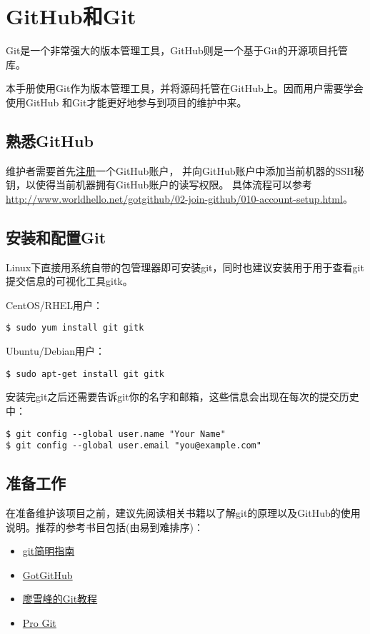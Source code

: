 \section{GitHub和Git}
Git是一个非常强大的版本管理工具，GitHub则是一个基于Git的开源项目托管库。

本手册使用Git作为版本管理工具，并将源码托管在GitHub上。因而用户需要学会使用GitHub
和Git才能更好地参与到项目的维护中来。

\subsection{熟悉GitHub}
维护者需要首先\href{https://github.com/join}{注册}一个GitHub账户，
并向GitHub账户中添加当前机器的SSH秘钥，以使得当前机器拥有GitHub账户的读写权限。
具体流程可以参考
\url{http://www.worldhello.net/gotgithub/02-join-github/010-account-setup.html}。

\subsection{安装和配置Git}
Linux下直接用系统自带的包管理器即可安装git，同时也建议安装用于用于查看git提交信息的可视化工具gitk。

CentOS/RHEL用户：
\begin{verbatim}
$ sudo yum install git gitk
\end{verbatim}

Ubuntu/Debian用户：
\begin{verbatim}
$ sudo apt-get install git gitk
\end{verbatim}

安装完git之后还需要告诉git你的名字和邮箱，这些信息会出现在每次的提交历史中：
\begin{verbatim}
$ git config --global user.name "Your Name"
$ git config --global user.email "you@example.com"
\end{verbatim}

\subsection{准备工作}
在准备维护该项目之前，建议先阅读相关书籍以了解git的原理以及GitHub的使用说明。推荐的参考书目包括(由易到难排序)：
\begin{itemize}
\item \href{http://rogerdudler.github.io/git-guide/index.zh.html}{git简明指南}
\item \href{http://www.worldhello.net/gotgithub/index.html}{GotGitHub}
\item \href{http://www.liaoxuefeng.com/wiki/0013739516305929606dd18361248578c67b8067c8c017b000}{廖雪峰的Git教程}
\item \href{https://git-scm.com/book/zh/v2}{Pro Git}
\end{itemize}

